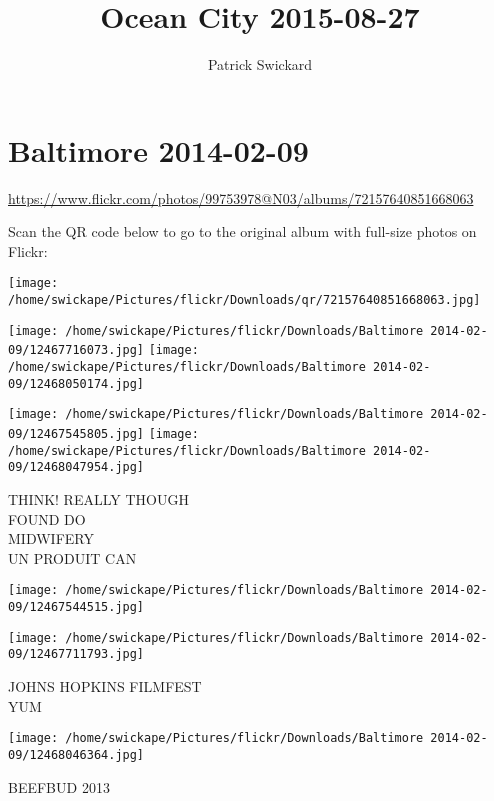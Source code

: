\documentclass[10pt,letterpaper]{article}
\title{Ocean City 2015-08-27}
\author{Patrick Swickard}
\date{}
\begin{document}
\section*{Baltimore 2014-02-09}

\url{https://www.flickr.com/photos/99753978@N03/albums/72157640851668063}

Scan the QR code below to go to the original album with full-size photos on Flickr:

\texttt{[image: /home/swickape/Pictures/flickr/Downloads/qr/72157640851668063.jpg]}
\pagebreak

\texttt{[image: /home/swickape/Pictures/flickr/Downloads/Baltimore 2014-02-09/12467716073.jpg]}
\texttt{[image: /home/swickape/Pictures/flickr/Downloads/Baltimore 2014-02-09/12468050174.jpg]}

\texttt{[image: /home/swickape/Pictures/flickr/Downloads/Baltimore 2014-02-09/12467545805.jpg]}
\texttt{[image: /home/swickape/Pictures/flickr/Downloads/Baltimore 2014-02-09/12468047954.jpg]}

THINK!  REALLY THOUGH\\
FOUND DO\\
MIDWIFERY\\
UN PRODUIT CAN
\pagebreak

\texttt{[image: /home/swickape/Pictures/flickr/Downloads/Baltimore 2014-02-09/12467544515.jpg]}

\vspace{0.25in}
\texttt{[image: /home/swickape/Pictures/flickr/Downloads/Baltimore 2014-02-09/12467711793.jpg]}

JOHNS HOPKINS FILMFEST\\
YUM
\pagebreak

\texttt{[image: /home/swickape/Pictures/flickr/Downloads/Baltimore 2014-02-09/12468046364.jpg]}

BEEFBUD 2013
\pagebreak
\end{document}

